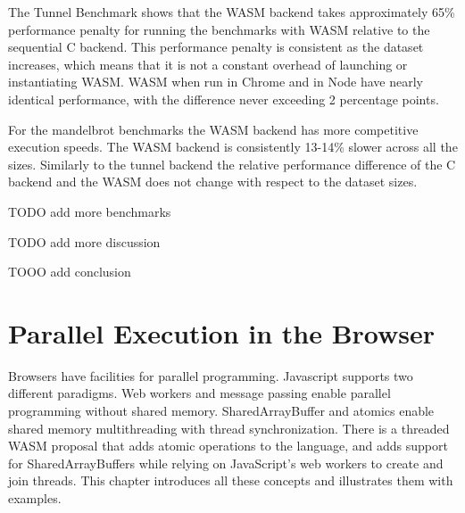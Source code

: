 \documentclass[11pt]{book}
\begin{document}
The Tunnel Benchmark shows that the WASM backend takes approximately 65\% performance penalty for running the benchmarks with WASM relative to the sequential C backend. This performance penalty is consistent as the dataset increases, which means that it is not a constant overhead of launching or instantiating WASM. WASM when run in Chrome and in Node have nearly identical performance, with the difference never exceeding 2 percentage points.

\begin{table}[h!]
    \noindent{}
    \caption{Caption}
    \label{tab:my_label}
\end{table}

For the mandelbrot benchmarks the WASM backend has more competitive execution speeds. The WASM backend is consistently 13-14\% slower across all the sizes. Similarly to the tunnel backend the relative performance difference of the C backend and the WASM does not change with respect to the dataset sizes.


TODO add more benchmarks

TODO add more discussion

TOOO add conclusion
\chapter{Parallel Execution in the Browser}


Browsers have facilities for parallel programming. Javascript supports two different paradigms. Web workers and message passing enable parallel programming without shared memory. SharedArrayBuffer and atomics enable shared memory multithreading with thread synchronization. There is a threaded WASM proposal that adds atomic operations to the language, and adds support for SharedArrayBuffers while relying on JavaScript's web workers to create and join threads. This chapter introduces all these concepts and illustrates them with examples.
\end{document}
